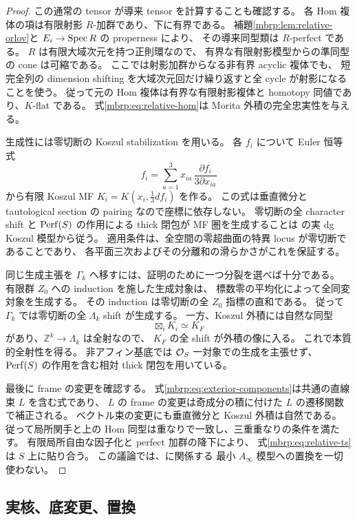 \begin{proof}
この通常の tensor が導来 tensor を計算することも確認する。
各 Hom 複体の項は有限射影 $R$-加群であり、下に有界である。
補題\ref{mbrp:lem:relative-orlov}と $E_i\to\operatorname{Spec} R$ の properness により、
その導来同型類は $R$-perfect である。
$R$ は有限大域次元を持つ正則環なので、
有界な有限射影模型からの準同型の cone は可縮である。
ここでは射影加群からなる非有界 acyclic 複体でも、
短完全列の dimension shifting を大域次元回だけ繰り返すと全 cycle が射影になることを使う。
従って元の Hom 複体は有界な有限射影複体と homotopy 同値であり、$K$-flat である。
式\eqref{mbrp:eq:relative-hom}は Morita 外積の完全忠実性を与える。

生成性には零切断の Koszul stabilization を用いる。
各 $f_i$ について Euler 恒等式
\[
 f_i=\sum_{a=1}^3 x_{ia}\,\frac{\partial f_i}{3\partial x_{ia}}
\]
から有限 Koszul MF $K_i=K(x_i,\tfrac13d f_i)$ を作る。
この式は垂直微分と tautological section の pairing なので座標に依存しない。
零切断の全 character shift と $\operatorname{Perf}(S)$ の作用による thick 閉包が
MF 圏を生成することは
\cite[Propositions~4.1, 4.2, 4.8]{MBRPBDFIK}の実 dg Koszul 模型から従う。
適用条件は、全空間の零超曲面の特異 locus が零切断であることであり、
各平面三次およびその分離和の滑らかさがこれを保証する。

同じ生成主張を $\Gamma_k$ へ移すには、証明のために一つ分裂を選べば十分である。
有限群 $Z_0$ への induction を施した生成対象は、
標数零の平均化によって全同変対象を生成する。
その induction は零切断の全 $Z_0$ 指標の直和である。
従って $\Gamma_k$ では零切断の全 $\Lambda_k$ shift が生成する。
一方、Koszul 外積には自然な同型
\[
 \boxtimes_i K_i\simeq K_{F}
\]
があり、$\mathbb Z^k\to\Lambda_k$ は全射なので、
$K_F$ の全 shift が外積の像に入る。
これで本質的全射性を得る。
非アフィン基底では $\mathcal O_S$ 一対象での生成を主張せず、
$\operatorname{Perf}(S)$ の作用を含む相対 thick 閉包を用いている。

最後に frame の変更を確認する。
式\eqref{mbrp:eq:exterior-components}は共通の直線束 $L$ を含む式であり、
$L$ の frame の変更は奇成分の積に付けた $L$ の遷移関数で補正される。
ベクトル束の変更にも垂直微分と Koszul 外積は自然である。
従って局所関手と上の Hom 同型は重なりで一致し、三重重なりの条件を満たす。
有限局所自由な因子化と perfect 加群の降下により、
式\eqref{mbrp:eq:relative-ts}は $S$ 上に貼り合う。
この議論では、\cite[Conjecture~5.1.2]{MBRPBDFIK}に関係する
最小 $A_\infty$ 模型への置換を一切使わない。
\end{proof}

\subsection{実核、底変更、置換}

